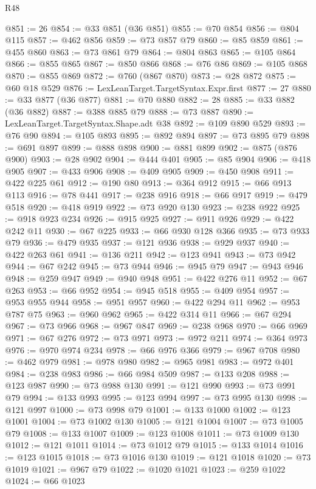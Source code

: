 \begin{lexlean}{R48}
\begin{coremodule}
@851 := 26
@854 := @33 @851 (@36 @851)
@855 := @70 @854
@856 := @804 @115
@857 := @462 @856
@859 := @73 @857 @79
@860 := @85 @859
@861 := @455 @860
@863 := @73 @861 @79
@864 := @804 @863
@865 := @105 @864
@866 := @855 @865
@867 := @850 @866
@868 := @76 @86
@869 := @105 @868
@870 := @855 @869
@872 := @760 (@867 @870)
@873 := @28 @872
@875 := @60 @18 @529
@876 := LexLeanTarget.TargetSyntax.Expr.first
@877 := 27
@880 := @33 @877 (@36 @877)
@881 := @70 @880
@882 := 28
@885 := @33 @882 (@36 @882)
@887 := @388 @885 @79
@888 := @73 @887
@890 := LexLeanTarget.TargetSyntax.Shape.adt @38
@892 := @109 @890 @529
@893 := @76 @90
@894 := @105 @893
@895 := @892 @894
@897 := @73 @895 @79
@898 := @691 @897
@899 := @888 @898
@900 := @881 @899
@902 := @875 (@876 @900)
@903 := @28 @902
@904 := @444 @401
@905 := @85 @904
@906 := @418 @905
@907 := @433 @906
@908 := @409 @905
@909 := @450 @908
@911 := @422 @225 @61
@912 := @190 @80
@913 := @364 @912
@915 := @66 @913 @113
@916 := @78 @441
@917 := @238 @916
@918 := @66 @917
@919 := @479 @518
@920 := @418 @919
@922 := @73 @920 @130
@923 := @238 @922
@925 := @918 @923 @234
@926 := @915 @925
@927 := @911 @926
@929 := @422 @242 @11
@930 := @67 @225
@933 := @66 @930 @128 @366
@935 := @73 @933 @79
@936 := @479 @935
@937 := @121 @936
@938 := @929 @937
@940 := @422 @263 @61
@941 := @136 @211
@942 := @123 @941
@943 := @73 @942
@944 := @67 @242
@945 := @73 @944
@946 := @945 @79
@947 := @943 @946
@948 := @259 @947
@949 := @940 @948
@951 := @422 @276 @11
@952 := @67 @263
@953 := @66 @952
@954 := @945 @518
@955 := @409 @954
@957 := @953 @955 @944
@958 := @951 @957
@960 := @422 @294 @11
@962 := @953 @787 @75
@963 := @960 @962
@965 := @422 @314 @11
@966 := @67 @294
@967 := @73 @966
@968 := @967 @847
@969 := @238 @968
@970 := @66 @969
@971 := @67 @276
@972 := @73 @971
@973 := @972 @211
@974 := @364 @973
@976 := @970 @974 @234
@978 := @66 @976 @366
@979 := @967 @708
@980 := @462 @979
@981 := @978 @980
@982 := @965 @981
@983 := @972 @401
@984 := @238 @983
@986 := @66 @984 @509
@987 := @133 @208
@988 := @123 @987
@990 := @73 @988 @130
@991 := @121 @990
@993 := @73 @991 @79
@994 := @133 @993
@995 := @123 @994
@997 := @73 @995 @130
@998 := @121 @997
@1000 := @73 @998 @79
@1001 := @133 @1000
@1002 := @123 @1001
@1004 := @73 @1002 @130
@1005 := @121 @1004
@1007 := @73 @1005 @79
@1008 := @133 @1007
@1009 := @123 @1008
@1011 := @73 @1009 @130
@1012 := @121 @1011
@1014 := @73 @1012 @79
@1015 := @133 @1014
@1016 := @123 @1015
@1018 := @73 @1016 @130
@1019 := @121 @1018
@1020 := @73 @1019
@1021 := @967 @79
@1022 := @1020 @1021
@1023 := @259 @1022
@1024 := @66 @1023

\end{coremodule}
\end{lexlean}
